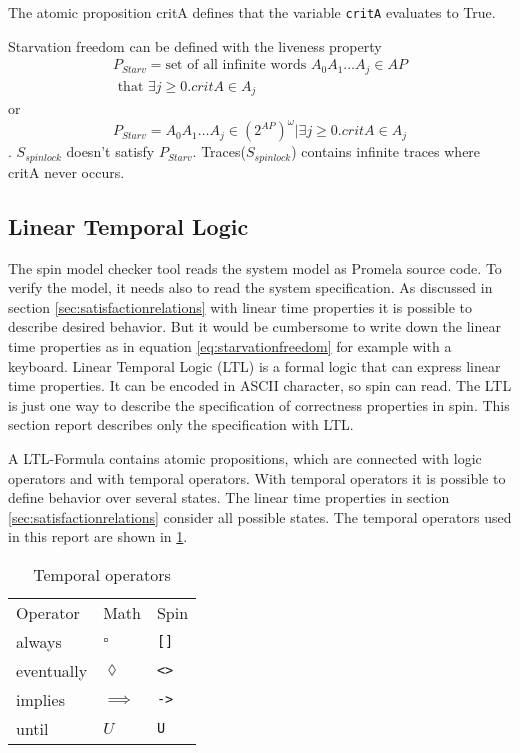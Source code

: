 \documentclass[12pt,a4paper,twoside]{article}
\begin{document}
The atomic proposition critA defines that the variable \texttt{critA} evaluates to True.

Starvation freedom can be defined with the liveness property
\begin{multline}
  \label{eq:starvationfreedom_in_words}
  P_{Starv} = \text{set of all infinite words } A_0 A_1 \dots A_j \in AP \\ \text{ that }\exists j \geq 0. critA \in A_j
\end{multline}
or
\begin{equation}
  \label{eq:starvationfreedom}
P_{Starv} = { A_0 A_1 \dots A_j \in (2^{AP})^{\omega} | \exists j \geq 0. critA \in A_j}
\end{equation}.
$S_{spinlock}$ doesn't satisfy $P_{Starv}$. Traces($S_{spinlock}$) contains infinite traces where critA never occurs.

\subsection{Linear Temporal Logic}
\label{sec:lineartemporallogic}

The spin model checker tool reads the system model as Promela source code. To verify the model, it needs also to read the system specification. As discussed in section \ref{sec:satisfactionrelations} with linear time properties it is possible to describe desired behavior. But it would be cumbersome to write down the linear time properties as in equation \ref{eq:starvationfreedom} for example with a keyboard. Linear Temporal Logic (LTL) is a formal logic that can express linear time properties. It can be encoded in ASCII character, so spin can read. The LTL is just one way to describe the specification of correctness properties in spin. This section report describes only the specification with LTL.

A LTL-Formula contains atomic propositions, which are connected with logic operators and with temporal operators. With temporal operators it is possible to define behavior over several states. The linear time properties in section \ref{sec:satisfactionrelations} consider all possible states. The temporal operators used in this report are shown in \ref{tab:temporal_operators}.

\begin{table}
  \centering
  \begin{tabular}{l l l}
    Operator & Math & Spin \\
    always & $\square$ & \verb|[]| \\
    eventually & $\lozenge$ & \verb|<>| \\
    implies & $\implies$ & \verb|->| \\
    until & $U$ & \verb|U|
  \end{tabular}
  \caption{Temporal operators }
  \label{tab:temporal_operators}
\end{table}
\end{document}
